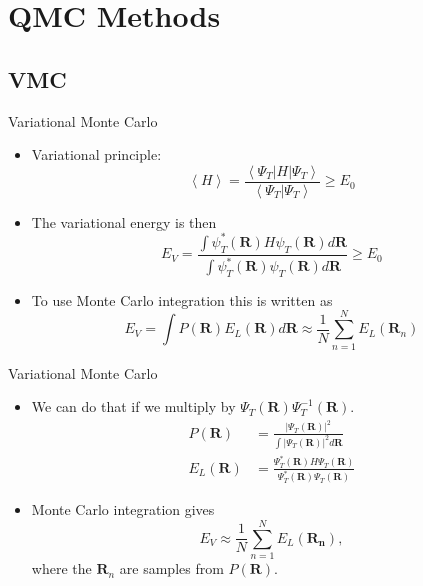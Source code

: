 \documentclass{beamer}
\newcommand{\ket}[1]{\left| #1 \right>}
\newcommand{\bra}[1]{\left< #1 \right|}
\newcommand{\braket}[2]{\left< #1 | #2 \right>}
\newcommand{\R}{\mathbf{R}}
\begin{document}
\section{QMC Methods}
\subsection{VMC}
\begin{frame}{Variational Monte Carlo}
\begin{itemize}
   \item Variational principle:
   \begin{equation*}
      \left<H\right> = \frac{\bra{\Psi_T}H\ket{\Psi_T}}{\braket{\Psi_T}{\Psi_T}} \ge E_0
   \end{equation*}
   \item The variational energy is then
   \begin{equation*}
      E_V = \frac{\int\psi_T^*(\R)H\psi_T(\R)d\R}{\int\psi_T^*(\R)\psi_T(\R)d\R} \ge E_0
   \end{equation*}
   \item To use Monte Carlo integration this is written as
   \begin{equation*}
      E_V = \int P(\R)E_L(\R) d\R \approx \frac{1}{N}\sum\limits_{n=1}^N E_L(\R_n)
   \end{equation*}
\end{itemize}
\end{frame}

\begin{frame}{Variational Monte Carlo}
\begin{itemize}
   \item We can do that if we multiply by $\Psi_T(\R)\Psi_T^{-1}(\R)$.
   \begin{align*}
      P(\R) &= \frac{|\Psi_T(\R)|^2}{\int|\Psi_T(\R)|^2d\R} \\
      E_L(\R) &= \frac{\Psi_T^*(\R) H \Psi_T(\R)}{\Psi_T^*(\R) \Psi_T(\R)}
   \end{align*}
   \item Monte Carlo integration gives
   \begin{equation*}
      E_V \approx \frac{1}{N} \sum\limits_{n=1}^N E_L(\mathbf{R_n}),
   \end{equation*}
   where the $\R_n$ are samples from $P(\R)$.
\end{itemize}
\end{frame}
\end{document}
